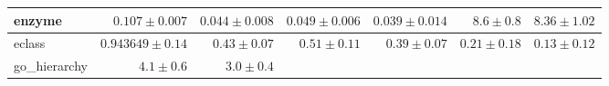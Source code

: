 \begin{frame}
\begin{figure}[H]
\begin{table}[]
{\begin{tabular}{|l|rrrrrr|}
enzyme &
  \multicolumn{1}{r|}{$0.107 \pm 0.007$} &
  \multicolumn{1}{r|}{$0.044 \pm 0.008$} &
  \multicolumn{1}{r|}{$0.049 \pm 0.006$} &
  \multicolumn{1}{r|}{$0.039 \pm 0.014$} &
  \multicolumn{1}{r|}{$8.6 \pm 0.8$} &
  $8.36 \pm 1.02$ \\ \hline
eclass &
  \multicolumn{1}{r|}{$0.943649 \pm 0.14$} &
  \multicolumn{1}{r|}{$0.43 \pm 0.07$} &
  \multicolumn{1}{r|}{$0.51 \pm 0.11$} &
  \multicolumn{1}{r|}{$0.39 \pm 0.07$} &
  \multicolumn{1}{r|}{$0.21 \pm 0.18$} &
  $0.13 \pm 0.12$ \\ \hline
go\_hierarchy &
  \multicolumn{1}{r|}{$4.1 \pm 0.6$} &
  \multicolumn{1}{r|}{$3.0 \pm 0.4$} &

\end{tabular}}
\end{table}
\end{figure}
\end{frame}

